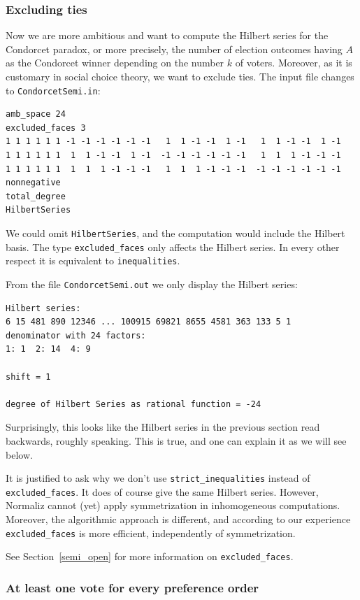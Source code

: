 \subsubsection{Excluding ties}\label{excluded_ex}

Now we are more ambitious and want to compute the Hilbert series for the Condorcet paradox, or more precisely, the number of election outcomes having $A$ as the Condorcet winner depending on the number $k$ of voters. Moreover, as it is customary in social choice theory, we want to exclude ties. The input file changes to \verb|CondorcetSemi.in|:
\begin{Verbatim}
amb_space 24
excluded_faces 3
1 1 1 1 1 1 -1 -1 -1 -1 -1 -1   1  1 -1 -1  1 -1   1  1 -1 -1  1 -1
1 1 1 1 1 1  1  1 -1 -1  1 -1  -1 -1 -1 -1 -1 -1   1  1  1 -1 -1 -1
1 1 1 1 1 1  1  1  1 -1 -1 -1   1  1  1 -1 -1 -1  -1 -1 -1 -1 -1 -1
nonnegative
total_degree
HilbertSeries
\end{Verbatim}
We could omit \verb|HilbertSeries|, and the computation would include the Hilbert basis. The type \verb|excluded_faces| only affects the Hilbert series. In every other respect it is equivalent to \verb|inequalities|.

From the file \verb|CondorcetSemi.out| we only display the Hilbert series:
\begin{Verbatim}
Hilbert series:
6 15 481 890 12346 ... 100915 69821 8655 4581 363 133 5 1 
denominator with 24 factors:
1: 1  2: 14  4: 9  

shift = 1

degree of Hilbert Series as rational function = -24
\end{Verbatim}
Surprisingly, this looks like the Hilbert series in the previous section read backwards, roughly speaking. This is true, and one can explain it as we will see below.

It is justified to ask why we don't use \verb|strict_inequalities| instead of \verb|excluded_faces|. It does of course give the same Hilbert series. However, Normaliz cannot (yet) apply symmetrization in inhomogeneous computations. Moreover, the algorithmic approach is different, and according to our experience \verb|excluded_faces| is more efficient, independently of symmetrization.

See Section~\ref{semi_open} for more information on \verb|excluded_faces|.

\subsubsection{At least one vote for every preference order}\label{strict_signs_ex}

